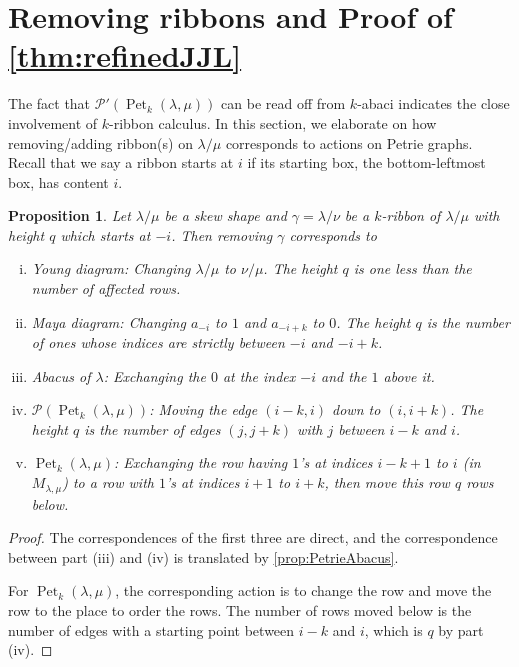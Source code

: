 \documentclass[pdflatex,sn-mathphys-num]{sn-jnl}%
\theoremstyle{thmstyleone}%
\newtheorem{proposition}[theorem]{Proposition}
\theoremstyle{thmstyletwo}%
\theoremstyle{thmstylethree}%
\numberwithin{equation}{section}
\DeclareMathOperator{\Pet}{Pet}
\begin{document}
\section{Removing ribbons and Proof of \texorpdfstring{\cref{thm:refinedJJL}}{Theorem 1.4}}\label{sec:Ribbon}

	The fact that $\mathcal{P}'(\Pet_k(\lambda,\mu))$ can be read off from $k$-abaci indicates the close involvement of $k$-ribbon calculus. In this section, we elaborate on how removing/adding ribbon(s) on $\lambda/\mu$ corresponds to actions on Petrie graphs. Recall that we say a ribbon starts at $i$ if its starting box, the bottom-leftmost box, has content $i$.
	
	\begin{proposition} \label{prop:removingHook}
		Let $\lambda/\mu$ be a skew shape and $\gamma=\lambda/\nu$ be a $k$-ribbon of $\lambda/\mu$ with height $q$ which starts at $-i$. Then removing $\gamma$ corresponds to
		\begin{enumerate}[(i)]
			\item Young diagram: Changing $\lambda/\mu$ to $\nu/\mu$. The height $q$ is one less than the number of affected rows.
			\item Maya diagram: Changing $a_{-i}$ to $1$ and $a_{-i+k}$ to $0$. The height $q$ is the number of ones whose indices are strictly between $-i$ and $-i+k$.
			\item Abacus of $\lambda$: Exchanging the $0$ at the index $-i$ and the $1$ above it. 
			\item $\mathcal{P}(\Pet_k(\lambda,\mu))$: Moving the edge $(i-k,i)$ down to $(i,i+k)$. The height $q$ is the number of edges $(j,j+k)$ with $j$ between $i-k$ and $i$. 
			\item $\Pet_k(\lambda,\mu)$: Exchanging the row having $1$'s at indices $i-k+1$ to $i$ (in $M_{\lambda,\mu}$) to a row with $1$'s at indices $i+1$ to $i+k$, then move this row $q$ rows below.
		\end{enumerate}
	\end{proposition}
	\begin{proof}
		The correspondences of the first three are direct, and the correspondence between part (iii) and (iv) is translated by \cref{prop:PetrieAbacus}.
		
		For $\Pet_k(\lambda,\mu)$, the corresponding action is to change the row and move the row to the place to order the rows. The number of rows moved below is the number of edges with a starting point between $i-k$ and $i$, which is $q$ by part (iv).
    \end{proof}
    
\end{document}
